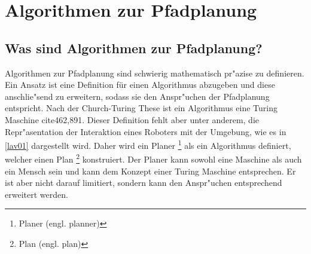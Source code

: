 \chapter{Algorithmen zur Pfadplanung}
\section{Was sind Algorithmen zur Pfadplanung?}

Algorithmen zur Pfadplanung sind schwierig mathematisch pr"azise zu definieren. Ein Ansatz ist eine Definition für einen Algorithmus abzugeben und diese anschlie"send zu erweitern, sodass sie den Anspr"uchen der Pfadplanung entspricht. Nach der Church-Turing These ist ein Algorithmus eine Turing Maschine cite{462,891}. Dieser Definition fehlt aber unter anderem, die Repr"asentation der Interaktion eines Roboters mit der Umgebung, wie es in \ref{lav01} dargestellt wird. Daher wird ein Planer \footnote{Planer (engl. planner)} als ein Algorithmus definiert, welcher einen Plan \footnote{Plan (engl. plan)} konstruiert. Der Planer kann sowohl eine Maschine als auch ein Mensch sein und kann dem Konzept einer Turing Maschine entsprechen. Er ist aber nicht darauf limitiert, sondern kann den Anspr"uchen entsprechend erweitert werden.\cite[~S. 19ff]{Lav06} 


